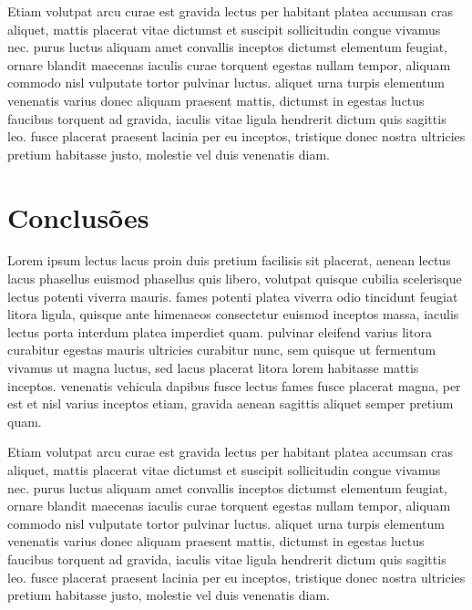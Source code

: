 \documentclass[journal,article,submit,moreauthors,pdftex,10pt,a4paper]{mdpi}
\begin{document}
Etiam volutpat arcu curae est gravida lectus per habitant platea accumsan cras aliquet, mattis placerat vitae dictumst et suscipit sollicitudin congue vivamus nec. purus luctus aliquam amet convallis inceptos dictumst elementum feugiat, ornare blandit maecenas iaculis curae torquent egestas nullam tempor, aliquam commodo nisl vulputate tortor pulvinar luctus. aliquet urna turpis elementum venenatis varius donec aliquam praesent mattis, dictumst in egestas luctus faucibus torquent ad gravida, iaculis vitae ligula hendrerit dictum quis sagittis leo. fusce placerat praesent lacinia per eu inceptos, tristique donec nostra ultricies pretium habitasse justo, molestie vel duis venenatis diam. 

\section{Conclusões}

Lorem ipsum lectus lacus proin duis pretium facilisis sit placerat, aenean lectus lacus phasellus euismod phasellus quis libero, volutpat quisque cubilia scelerisque lectus potenti viverra mauris. fames potenti platea viverra odio tincidunt feugiat litora ligula, quisque ante himenaeos consectetur euismod inceptos massa, iaculis lectus porta interdum platea imperdiet quam. pulvinar eleifend varius litora curabitur egestas mauris ultricies curabitur nunc, sem quisque ut fermentum vivamus ut magna luctus, sed lacus placerat litora lorem habitasse mattis inceptos. venenatis vehicula dapibus fusce lectus fames fusce placerat magna, per est et nisl varius inceptos etiam, gravida aenean sagittis aliquet semper pretium quam. 

Etiam volutpat arcu curae est gravida lectus per habitant platea accumsan cras aliquet, mattis placerat vitae dictumst et suscipit sollicitudin congue vivamus nec. purus luctus aliquam amet convallis inceptos dictumst elementum feugiat, ornare blandit maecenas iaculis curae torquent egestas nullam tempor, aliquam commodo nisl vulputate tortor pulvinar luctus. aliquet urna turpis elementum venenatis varius donec aliquam praesent mattis, dictumst in egestas luctus faucibus torquent ad gravida, iaculis vitae ligula hendrerit dictum quis sagittis leo. fusce placerat praesent lacinia per eu inceptos, tristique donec nostra ultricies pretium habitasse justo, molestie vel duis venenatis diam.  


\end{document}
